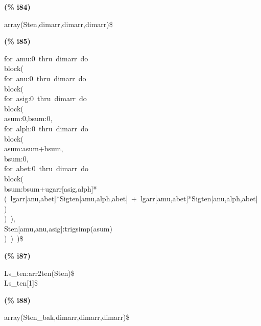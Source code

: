 \documentclass[fleqn]{article}
\begin{document}
\noindent
\begin{minipage}[t]{4.000000em}\color{red}\bfseries
(\% i84)	
\end{minipage}
\begin{minipage}[t]{\textwidth}\color{blue}
array(Sten,dimarr,dimarr,dimarr)\$
\end{minipage}

\noindent%



\noindent
\begin{minipage}[t]{4.000000em}\color{red}\bfseries
(\% i85)	
\end{minipage}
\begin{minipage}[t]{\textwidth}\color{blue}
for\ amu:0\ thru\ dimarr\ do\\
block(\\
for\ anu:0\ thru\ dimarr\ do\\
block(\\
for\ asig:0\ thru\ dimarr\ do\\
block(\\
asum:0,bsum:0,\\
for\ alph:0\ thru\ dimarr\ do\\
block(\\
asum:asum+bsum,\\
bsum:0,\\
for\ abet:0\ thru\ dimarr\ do\\
block(\\
bsum:bsum+ugarr[asig,alph]*(\ lgarr[anu,abet]*Sigten[amu,alph,abet]\ +\ lgarr[amu,abet]*Sigten[anu,alph,abet]\ )\ \\
)\ ),\\
Sten[amu,anu,asig]:trigsimp(asum)\ \\
)\ )\ )\$
\end{minipage}

\noindent%



\noindent
\begin{minipage}[t]{4.000000em}\color{red}\bfseries
(\% i87)	
\end{minipage}
\begin{minipage}[t]{\textwidth}\color{blue}
Ls\_ten:arr2ten(Sten)\$\\
Ls\_ten[1]\$
\end{minipage}

\noindent%



\noindent
\begin{minipage}[t]{4.000000em}\color{red}\bfseries
(\% i88)	
\end{minipage}
\begin{minipage}[t]{\textwidth}\color{blue}
array(Sten\_bak,dimarr,dimarr,dimarr)\$
\end{minipage}
\end{document}
